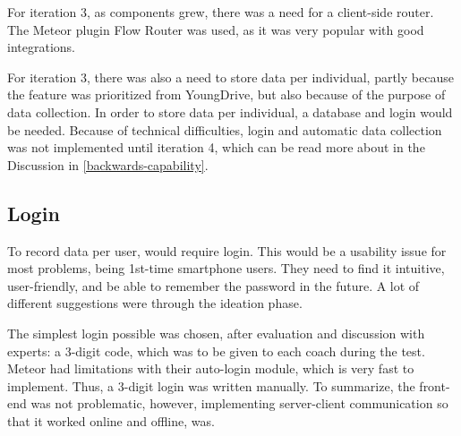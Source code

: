 For iteration 3, as components grew, there was a need for a client-side router. The Meteor plugin Flow Router was used, as it was very popular with good integrations.

For iteration 3, there was also a need to store data per individual, partly because the feature was prioritized from YoungDrive, but also because of the purpose of data collection. In order to store data per individual, a database and login would be needed. Because of technical difficulties, login and automatic data collection was not implemented until iteration 4, which can be read more about in the Discussion in \ref{backwards-capability}.

\subsection{Login}
To record data per user, would require login. This would be a usability issue for most problems, being 1st-time smartphone users. They need to find it intuitive, user-friendly, and be able to remember the password in the future. A lot of different suggestions were through the ideation phase.

The simplest login possible was chosen, after evaluation and discussion with experts: a 3-digit code, which was to be given to each coach during the test. Meteor had limitations with their auto-login module, which is very fast to implement. Thus, a 3-digit login was written manually. To summarize, the front-end was not problematic, however, implementing server-client communication so that it worked online and offline, was.



